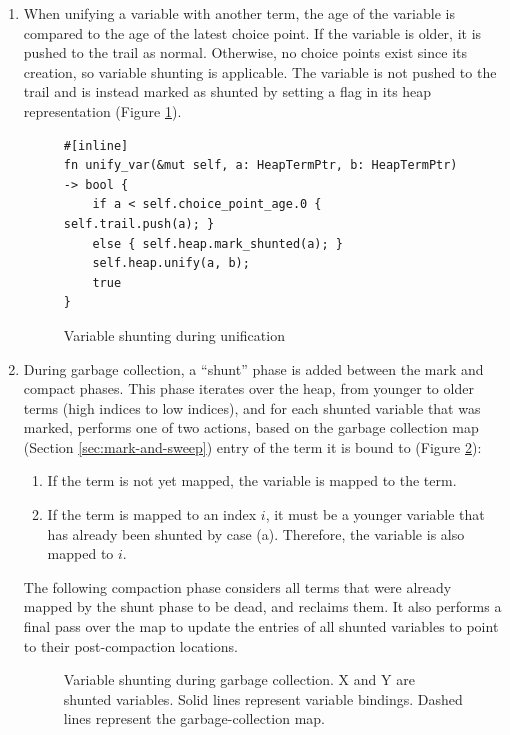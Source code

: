 \begin{enumerate}
\item When unifying a variable with another term, the age of the variable is compared to the age of the latest choice point. If the variable is older, it is pushed to the trail as normal. Otherwise, no choice points exist since its creation, so variable shunting is applicable. The variable is not pushed to the trail and is instead marked as shunted by setting a flag in its heap representation (Figure \ref{fig:unify-var}).

\begin{figure}[H]
\centering
\begin{verbatim}
#[inline]
fn unify_var(&mut self, a: HeapTermPtr, b: HeapTermPtr) -> bool {
    if a < self.choice_point_age.0 { self.trail.push(a); }
    else { self.heap.mark_shunted(a); }
    self.heap.unify(a, b);
    true
}
\end{verbatim}
\caption{Variable shunting during unification}
\label{fig:unify-var}
\end{figure}

\item During garbage collection, a ``shunt'' phase is added between the mark and compact phases. This phase iterates over the heap, from younger to older terms (high indices to low indices), and for each shunted variable that was marked, performs one of two actions, based on the garbage collection map (Section \ref{sec:mark-and-sweep}) entry of the term it is bound to (Figure \ref{fig:shunt-cases}):
\begin{enumerate}
\item If the term is not yet mapped, the variable is mapped to the term.
\item If the term is mapped to an index $i$, it must be a younger variable that has already been shunted by case (a). Therefore, the variable is also mapped to $i$.
\end{enumerate}

The following compaction phase considers all terms that were already mapped by the shunt phase to be dead, and reclaims them. It also performs a final pass over the map to update the entries of all shunted variables to point to their post-compaction locations.

\begin{figure}[H]
\centering
{}
\caption{Variable shunting during garbage collection. X and Y are shunted variables. Solid lines represent variable bindings. Dashed lines represent the garbage-collection map.}
\label{fig:shunt-cases}
\end{figure}

\end{enumerate}

